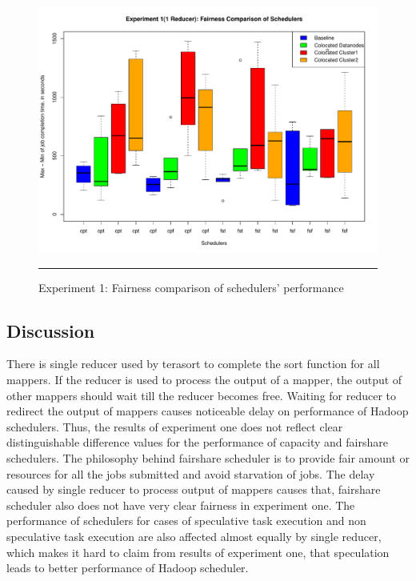  \begin{figure}[htbp]
  \centering
    \includegraphics[width=\textwidth,height=\textheight,keepaspectratio]{./Figures/exp_1_max-min.pdf}
    \rule{35em}{0.5pt}
  \caption{Experiment 1: Fairness comparison of schedulers' performance }
  \label{fig:exp_1_max-min}
\end{figure} 
  

\subsection{Discussion}

There is single reducer used by terasort to complete the sort function for all mappers. If the reducer is used to process the output of a mapper, the output of other mappers should wait till the reducer becomes free. Waiting for reducer to redirect the output of mappers causes noticeable delay on performance of Hadoop schedulers. Thus, the results of experiment one does not reflect clear distinguishable difference values for the performance of capacity and fairshare schedulers. The philosophy behind fairshare scheduler is to provide fair amount or resources for all the jobs submitted and avoid starvation of jobs.  The delay caused by single reducer to process output of mappers causes that, fairshare scheduler also does not have very clear fairness in experiment one. The performance of schedulers for cases of speculative task execution and non speculative task execution are also affected almost equally by single reducer, which makes it hard to claim from results of experiment one, that speculation leads to better performance of Hadoop scheduler. \\ 


